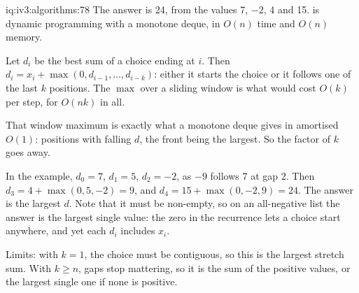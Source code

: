 \begin{solution}{iq:iv3:algorithms:78}
The answer is 24, from the values 7, $-2$, 4 and 15.  is dynamic programming with a monotone deque, in $O(n)$ time and $O(n)$ memory.
\label{lst:iv3:al:gapped}

Let $d_i$ be the best sum of a choice ending at $i$. Then $d_i = x_i + \max(0, d_{i-1}, \dots, d_{i-k})$: either it starts the choice or it follows one of the last $k$ positions. The $\max$ over a sliding window is what would cost $O(k)$ per step, for $O(nk)$ in all.

That window maximum is exactly what a monotone deque gives in amortised $O(1)$: positions with falling $d$, the front being the largest. So the factor of $k$ goes away.

In the example, $d_0 = 7$, $d_1 = 5$, $d_2 = -2$, as $-9$ follows 7 at gap 2. Then $d_3 = 4 + \max(0, 5, -2) = 9$, and $d_4 = 15 + \max(0, -2, 9) = 24$. The answer is the largest $d$. Note that it must be non-empty, so on an all-negative list the answer is the largest single value: the zero in the recurrence lets a choice start anywhere, and yet each $d_i$ includes $x_i$.

Limits: with $k = 1$, the choice must be contiguous, so this is the largest stretch sum. With $k \ge n$, gaps stop mattering, so it is the sum of the positive values, or the largest single one if none is positive.

\end{solution}

